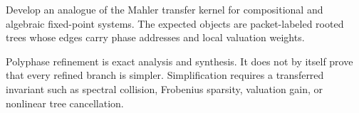\begin{problem}
Develop an analogue of the Mahler transfer kernel for compositional and algebraic fixed-point systems. The expected objects are packet-labeled rooted trees whose edges carry phase addresses and local valuation weights.
\end{problem}

\begin{boundary}
Polyphase refinement is exact analysis and synthesis. It does not by itself prove that every refined branch is simpler. Simplification requires a transferred invariant such as spectral collision, Frobenius sparsity, valuation gain, or nonlinear tree cancellation.
\end{boundary}

